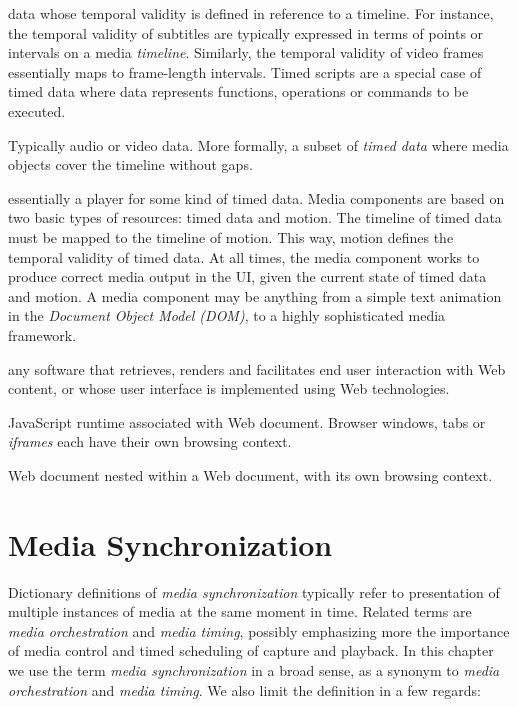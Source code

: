 \documentclass[graybox]{svmult}
\begin{document}

data whose temporal validity is defined in reference to a timeline. For
instance, the temporal validity of subtitles are typically expressed in terms
of points or intervals on a media \emph{timeline}. Similarly, the temporal validity
of video frames essentially maps to frame-length intervals. Timed scripts are
a special case of timed data where data represents functions, operations or
commands to be executed.



Typically audio or video data. More formally, a subset of \emph{timed data}
where media objects cover the timeline without gaps.



essentially a player for some kind of timed data. Media components are based
on two basic types of resources: timed data and motion. The timeline of timed
data must be mapped to the timeline of motion. This way, motion defines the
temporal validity of timed data. At all times, the media component works to
produce correct media output in the UI, given the current state of timed data
and motion. A media component may be anything from a simple text animation in
the \emph{Document Object Model (DOM)}, to a highly sophisticated media framework.



any software that retrieves, renders and facilitates end user interaction with
Web content, or whose user interface is implemented using Web technologies.


JavaScript runtime associated with Web document. Browser windows, tabs or
\emph{iframes} each have their own browsing context.


Web document nested within a Web document, with its own browsing context.


\section{Media Synchronization}
\label{sec:mediasync}
Dictionary definitions of \emph{media synchronization} typically refer to
presentation of multiple instances of media at the same moment in time. Related terms
are \emph{media orchestration} and \emph{media timing}, possibly emphasizing more the importance of
media control and timed scheduling of capture and playback. In this chapter we use
the term \emph{media synchronization} in a broad sense, as a synonym to
\emph{media orchestration} and \emph{media timing}. We also limit the
definition in a few regards:
\end{document}
